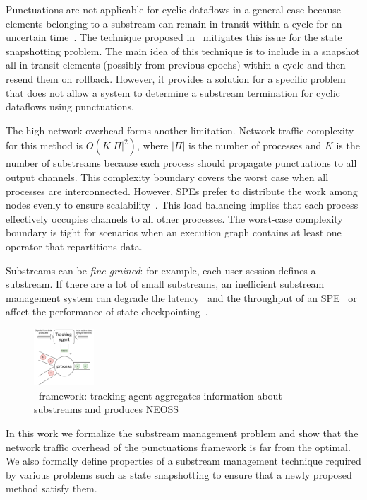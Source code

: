 Punctuations are not applicable for cyclic dataflows in a general case because elements belonging to a substream can remain in transit within a cycle for an uncertain time~\cite{carbone2018scalable}. The technique proposed in~\cite{Carbone:2017:SMA:3137765.3137777} mitigates this issue for the state snapshotting problem. The main idea of this technique is to include in a snapshot all in-transit elements (possibly from previous epochs) within a cycle and then resend them on rollback. However, it provides a solution for a specific problem that does not allow a system to determine a substream termination for cyclic dataflows using punctuations.

The high network overhead forms another limitation. Network traffic complexity for this method is $O(K|\Pi|^2)$, where $|\Pi|$ is the number of processes and $K$ is the number of substreams because each process should propagate punctuations to all output channels. This complexity boundary covers the worst case when all processes are interconnected. However, SPEs prefer to distribute the work among nodes evenly to ensure scalability~\cite{carbone2015apache, Kulkarni:2015:THS:2723372.2742788, Akidau:2013:MFS:2536222.2536229}. This load balancing implies that each process effectively occupies channels to all other processes. The worst-case complexity boundary is tight for scenarios when an execution graph contains at least one operator that repartitions data.

Substreams can be {\em fine-grained}: for example, each user session defines a substream. If there are a lot of small substreams, an inefficient substream management system can degrade the latency~\cite{DBLP:journals/pvldb/BegoliACHKKMS21} and the throughput of an SPE~\cite{Li:2008:OPN:1453856.1453890} or affect the performance of state checkpointing~\cite{zhang2021research}.

\begin{figure}[t]
  \centering
  \includegraphics[width=0.20\textwidth]{pics/tracker-scheme.pdf}
  \caption{\tracker\ framework: tracking agent aggregates information about substreams and produces NEOSS}
  \label{tracker_scheme}
\end{figure}

In this work we formalize the substream management problem and show that the network traffic overhead of the punctuations framework is far from the optimal. We also formally define properties of a substream management technique required by various problems such as state snapshotting to ensure that a newly proposed method satisfy them. 

